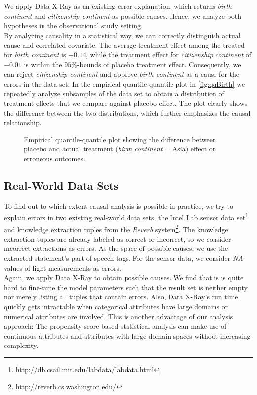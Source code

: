\documentclass[acmsmall, nonacm, screen]{acmart} %
\begin{document}
We apply Data X-Ray as an existing error explanation, which returns \textit{birth continent} and \textit{citizenship continent} as possible causes. Hence, we analyze both hypotheses in the observational study setting.\\

By analyzing causality in a statistical way, we can correctly distinguish actual cause and correlated covariate. The average treatment effect among the treated for \textit{birth continent} is $-0.14$, while the treatment effect for \textit{citizenship continent} of $-0.01$ is within the $95\%$-bounds of placebo treatment effect.
Consequently, we can reject \textit{citizenship continent} and approve \textit{birth continent} as a cause for the errors in the data set.
In the empirical quantile-quantile plot in \autoref{fig:qqBirth} we repeatedly analyze subsamples of the data set to obtain a distribution of treatment effects that we compare against placebo effect.
The plot clearly shows the difference between the two distributions, which further emphasizes the causal relationship.
\begin{figure}[htbp]
\caption{Empirical quantile-quantile plot showing the difference between placebo and actual treatment (\textit{birth continent} = Asia) effect on erroneous outcomes.}
\label{fig:qqBirth}
\end{figure}


\subsection{Real-World Data Sets}
To find out to which extent causal analysis is possible in practice, we try to explain errors in two existing real-world data sets, the Intel Lab sensor data set\footnote{\url{http://db.csail.mit.edu/labdata/labdata.html}} and knowledge extraction tuples from the \textit{Reverb} system\footnote{\url{http://reverb.cs.washington.edu/}}. 
The knowledge extraction tuples are already labeled as correct or incorrect, so we consider incorrect extractions as errors. As the space of possible causes, we use the extracted statement's part-of-speech tags. For the sensor data, we consider \textit{NA}-values of light measurements as errors.\\

Again, we apply Data X-Ray to obtain possible causes. We find that is is quite hard to fine-tune the model parameters such that the result set is neither empty nor merely listing all tuples that contain errors.
Also, Data X-Ray's run time quickly gets intractable when categorical attributes have large domains or numerical attributes are involved.
This is another advantage of our analysis approach: The propensity-score based statistical analysis can make use of continuous attributes and attributes with large domain spaces without increasing complexity.\\
\end{document}
